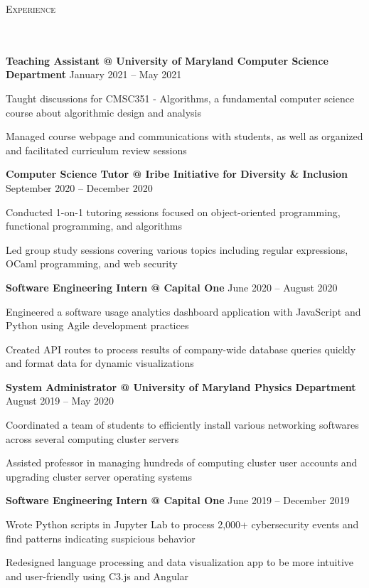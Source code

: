 \documentclass{article}
\newcommand{\header}[1]{{
\hspace*{-15pt}\vspace*{6pt} \large \scshape{#1}} \vspace*{-6pt} 
\lineunder
}
\newcommand{\lineunder}{
\vspace*{-8pt} \\ \hspace*{-18pt} 
\hrulefill \\
}
\newcommand{\employer}[4]{{
\vspace*{2pt}%
\textbf{#1} #2 \hfill #3\\ #4 \vspace*{2pt}}
}
\renewcommand{\labelitemii}{
$\vcenter{\hbox{\tiny$\bullet$}}$\hspace*{-3pt}
}
\newenvironment{bullet-list-minor}{
\begin{list}{\labelitemii}{\setlength\leftmargin{15pt} 
\topsep 0pt \itemsep -2pt}}{\vspace*{4pt}\end{list}
}
\begin{document}
\header{Experience}
    \vspace{2pt}
    \employer{Teaching Assistant @ University of Maryland Computer Science Department}{}{January  2021 -- May 2021}{}
	\begin{bullet-list-minor}
	\item Taught discussions for CMSC351 - Algorithms, a fundamental computer science course about algorithmic design and analysis
    \item 
    Managed course webpage and communications with students, as well as organized and facilitated curriculum review sessions
    \end{bullet-list-minor}
    \smallskip
    \employer{Computer Science Tutor @ Iribe Initiative for Diversity \& Inclusion}{}{September 2020 -- December 2020}{}
	\begin{bullet-list-minor}
	\item Conducted 1-on-1 tutoring sessions focused on object-oriented programming, functional programming, and algorithms
    \item Led group study sessions covering various topics including regular expressions, OCaml programming, and web security
    \end{bullet-list-minor}
    \smallskip
    \employer{Software Engineering Intern @ Capital One}{}{June 2020 -- August 2020}{}
	\begin{bullet-list-minor}
	\item Engineered a software usage analytics dashboard application with JavaScript and Python using Agile development practices
	\item Created API routes to process results of company-wide database queries quickly and format data for dynamic visualizations
    \end{bullet-list-minor}
    \smallskip
    \employer{System Administrator @ University of Maryland Physics Department}{}{August 2019 -- May 2020}{}
	\begin{bullet-list-minor}
	\item Coordinated a team of students to efficiently install various networking softwares across several computing cluster servers
	\item Assisted professor in managing hundreds of computing cluster user accounts and upgrading cluster server operating systems
    \end{bullet-list-minor}
    \smallskip  
    \employer{Software Engineering Intern @ Capital One}{}{June 2019 -- December 2019}{}
	\begin{bullet-list-minor}
	\item Wrote Python scripts in Jupyter Lab to process 2,000+  cybersecurity events and find patterns indicating suspicious behavior
	\item Redesigned language processing and data visualization app to be more intuitive and user-friendly using C3.js and Angular
    \end{bullet-list-minor}
\end{document}
